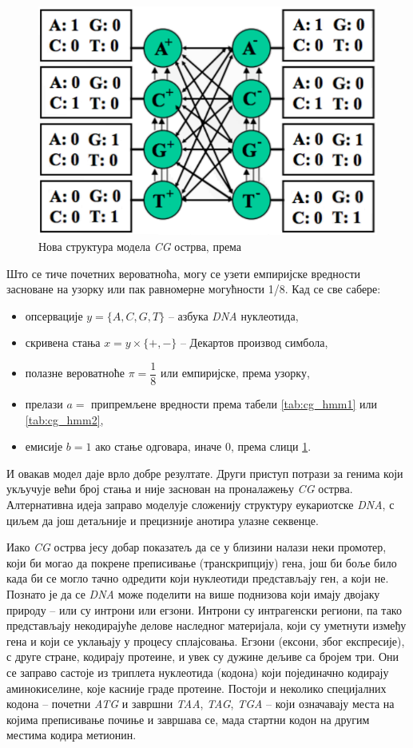 \documentclass[12pt,oneside]{memoir}
\begin{document}
\begin{CJK}{UTF8}{ipxm}
\begin{figure}[H]
  \centering
  \includegraphics[width=.7\textwidth]{cg_stanja.png}
  \caption{Нова структура модела \textit{CG} острва, према \cite{kellis2021}}
  \label{fig:cg_stanja}
\end{figure}

Што се тиче почетних вероватноћа, могу се узети емпиријске вредности засноване на узорку или пак равномерне могућности 1/8. Кад се све сабере:
\begin{itemize}
  \item опсервације $y = \{A, C, G, T\}$ -- азбука \textit{DNA} нуклеотида,
  \item скривена стања $x = y \times \{+, -\}$ -- Декартов производ симбола,
  \item полазне вероватноће $\pi = \dfrac{1}{8}$ или емпиријске, према узорку,
  \item прелази $a =$ припремљене вредности према табели \ref{tab:cg_hmm1} или \ref{tab:cg_hmm2},
  \item емисије $b = 1$ ако стање одговара, иначе $0$, према слици \ref{fig:cg_stanja}.
\end{itemize}

И овакав модел даје врло добре резултате. Други приступ потрази за генима који укључује већи број стања и није заснован на проналажењу \textit{CG} острва. Алтернативна идеја заправо моделује сложенију структуру еукариотске \textit{DNA}, с циљем да још детаљније и прецизније анотира улазне секвенце.

Иако \textit{CG} острва јесу добар показатељ да се у близини налази неки промотер, који би могао да покрене преписивање (транскрипцију) гена, још би боље било када би се могло тачно одредити који нуклеотиди представљају ген, а који не. Познато је да се \textit{DNA} може поделити на више поднизова који имају двојаку природу -- или су интрони или егзони\cite{knapp2007, yoon2009}. Интрони су интрагенски региони, па тако представљају некодирајуће делове наследног материјала, који су уметнути између гена и који се уклањају у процесу сплајсовања. Егзони (ексони, због експресије), с друге стране, кодирају протеине, и увек су дужине дељиве са бројем три. Они се заправо састоје из триплета нуклеотида (кодона) који појединачно кодирају аминокиселине, које касније граде протеине. Постоји и неколико специјалних кодона -- почетни \textit{ATG} и завршни \textit{TAA}, \textit{TAG}, \textit{TGA} -- који означавају места на којима преписивање почиње и завршава се, мада стартни кодон на другим местима кодира метионин.


\end{CJK}
\end{document}
